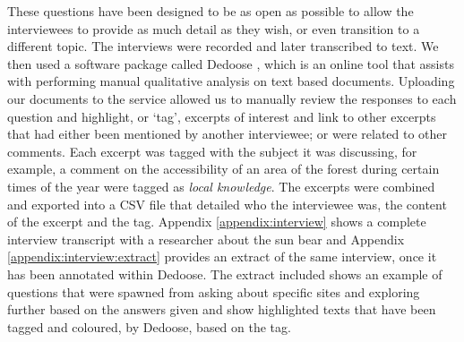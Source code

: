 			These questions have been designed to be as open as possible to allow the interviewees to provide as much detail as they wish, or even transition to a different topic. The interviews were recorded and later transcribed to text. We then used a software package called Dedoose \cite{dedoose2012web}, which is an online tool that assists with performing manual qualitative analysis on text based documents. Uploading our documents to the service allowed us to manually review the responses to each question and highlight, or `tag', excerpts of interest and link to other excerpts that had either been mentioned by another interviewee; or were related to other comments. Each excerpt was tagged with the subject it was discussing, for example, a comment on the accessibility of an area of the forest during certain times of the year were tagged as \textit{local knowledge}. The excerpts were combined and exported into a CSV file that detailed who the interviewee was, the content of the excerpt and the tag. Appendix \ref{appendix:interview} shows a complete interview transcript with a researcher about the sun bear and Appendix \ref{appendix:interview:extract} provides an extract of the same interview, once it has been annotated within Dedoose. The extract included shows an example of questions that were spawned from asking about specific sites and exploring further based on the answers given and show highlighted texts that have been tagged and coloured, by Dedoose, based on the tag.
			
